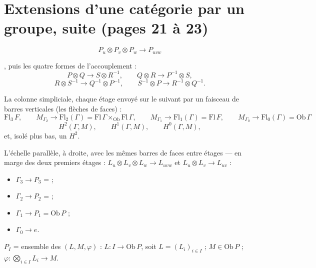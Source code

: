 \documentclass[11pt,a4paper]{article}
\begin{document}
\section*{Extensions d'une catégorie par un groupe, suite (pages 21 à 23)}


\[
P_u \otimes P_v \otimes P_w \longrightarrow P_{uvw}
\]

, puis les quatre formes de
l'accouplement :
\[
P \otimes Q \to S \otimes R^{-1}, \qquad
Q \otimes R \to P^{-1} \otimes S,
\]
\[
R \otimes S^{-1} \to Q^{-1} \otimes P^{-1}, \qquad
S^{-1} \otimes P \to R^{-1} \otimes Q^{-1}.
\]

La colonne simpliciale, chaque étage envoyé sur le suivant par un faisceau de
barres verticales (les flèches de faces) :
\[
\mathrm{Fl}_3\,F, \qquad
M_{\Gamma_2} \to \mathrm{Fl}_2(\Gamma) = \mathrm{Fl}\,\Gamma
\times_{\mathrm{Ob}} \mathrm{Fl}\,\Gamma, \qquad
M_{\Gamma_1} \to \mathrm{Fl}_1(\Gamma) = \mathrm{Fl}\,F, \qquad
M_{\Gamma_0} \to \mathrm{Fl}_0(\Gamma) = \mathrm{Ob}\,\Gamma
\]
\[
H^2(\Gamma, M), \qquad H^1(\Gamma, M), \qquad H^0(\Gamma, M),
\]
et, isolé plus bas, un $H^2$.

L'échelle parallèle, à droite, avec les mêmes barres de faces entre étages —
en marge des deux premiers étages : $L_u \otimes L_v \otimes L_w \to L_{uvw}$
et $L_u \otimes L_v \to L_{uv}$ :

\begin{itemize}
\item $\Gamma_3 \to P_3$ =  ;
\item $\Gamma_2 \to P_2$ =  ;
\item $\Gamma_1 \to P_1 = \mathrm{Ob}\,P$ ;
\item $\Gamma_0 \to e$.
\end{itemize}

$P_I$ = ensemble des \struck{\ill}  $(L, M, \varphi)$ :
$L : I \to \mathrm{Ob}\,P$, soit $L = (L_i)_{i \in I}$ ; $M \in \mathrm{Ob}\,P$ ;
$\varphi : \bigotimes_{i \in I} L_i \to M$.
\end{document}
